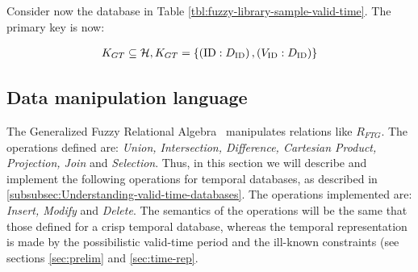 Consider now the database in Table \ref{tbl:fuzzy-library-sample-valid-time}. The primary key is now:

\begin{align}
 \nonumber
K_{GT} \subseteq \mathcal{H}, K_{GT} = \left \lbrace  \left(\text{ID}:D_{\text{ID}} \right) , \left(V_{\text{ID}}:D_{\text{ID}} \right) \right \rbrace	
\end{align}


\subsection{\label{subsec:data-manipulation}Data manipulation language}

The Generalized Fuzzy Relational Algebra~\cite{Medina1994} manipulates relations like $R_{FTG}$. The operations defined are: \emph{Union, Intersection, Difference, Cartesian Product, Projection, Join} and \emph{Selection}. Thus, in this section we will describe and implement the following operations for temporal databases, as described in \ref{subsubsec:Understanding-valid-time-databases}. The operations implemented are: \emph{Insert, Modify} and \emph{Delete}. The semantics of the operations will be the same that those defined for a crisp temporal database, whereas the temporal representation is made by the possibilistic valid-time period and the ill-known constraints (see sections \ref{sec:prelim} and \ref{sec:time-rep}.


